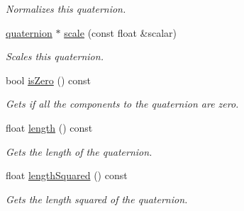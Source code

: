 \begin{DoxyCompactItemize}
\begin{DoxyCompactList}\small\item\em Normalizes this quaternion. \end{DoxyCompactList}\item 
\hyperlink{classflounder_1_1quaternion}{quaternion} $\ast$ \hyperlink{classflounder_1_1quaternion_a1dfbde3777eaa9fca021c63b40d2e2a4}{scale} (const float \&scalar)
\begin{DoxyCompactList}\small\item\em Scales this quaternion. \end{DoxyCompactList}\item 
bool \hyperlink{classflounder_1_1quaternion_ab42905249a14376445200771f2d9a4ca}{is\+Zero} () const
\begin{DoxyCompactList}\small\item\em Gets if all the components to the quaternion are zero. \end{DoxyCompactList}\item 
float \hyperlink{classflounder_1_1quaternion_a850de24f502de1071f91927866a9e966}{length} () const
\begin{DoxyCompactList}\small\item\em Gets the length of the quaternion. \end{DoxyCompactList}\item 
float \hyperlink{classflounder_1_1quaternion_a63bdf3ad75e034d94b0c3dd6e26a7ce8}{length\+Squared} () const
\begin{DoxyCompactList}\small\item\em Gets the length squared of the quaternion. \end{DoxyCompactList}\end{DoxyCompactItemize}
